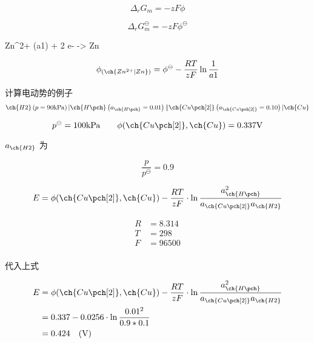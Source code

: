     \begin{equation*}
        \Delta_r G_m = -zF\phi
    \end{equation*}

    \begin{equation*}
        \Delta_r G_m ^\ominus = -zF\phi ^\ominus
    \end{equation*}

    \begin{reaction*}
        Zn^{2+} (a1) + 2 e- -> Zn
    \end{reaction*}

    \begin{equation*}
        \phi_{ \left( \ch{Zn^{2+} | Zn} \right) } = \phi^\ominus - \frac{RT}{zF} \ln \frac{1}{a1}
    \end{equation*}


    计算电动势的例子
    \begin{equation*}
        \ch{H2}\left( p = 90 \mathrm{kPa} \right) | \ch{H\pch} \left( a_{\ch{H\pch}} = 0.01 \right)  \| \ch{Cu\pch[2]} \left( a_{\ch{Cu\pch[2]}} = 0.10 \right)| \ch{Cu}
    \end{equation*}

    \begin{equation*}
        p^\ominus = 100 \mathrm{kPa} \qquad \phi(\ch{Cu\pch[2]}, \ch{Cu}) = 0.337 \mathrm{V}
    \end{equation*}

    $a_{\ch{H2}}$ 为 

    \begin{equation*}
        \frac{p}{p^\ominus} = 0.9
    \end{equation*}

    \begin{equation*}
        E = \phi(\ch{Cu\pch[2]}, \ch{Cu}) - \frac{RT}{zF} \cdot \ln \frac{a_{\ch{H\pch}}^2}{a_{\ch{Cu\pch[2]} }a_{\ch{H2}}}
    \end{equation*}

    \begin{align*}
        R &= 8.314 \\
        T &= 298 \\ 
        F &= 96500 \\ 
    \end{align*}

    代入上式

    \begin{align*}
        E &= \phi(\ch{Cu\pch[2]}, \ch{Cu}) - \frac{RT}{zF} \cdot \ln \frac{a_{\ch{H\pch}}^2}{a_{\ch{Cu\pch[2]} }a_{\ch{H2}}} \\ 
        &= 0.337 - 0.0256 \cdot \ln \frac{0.01^2}{0.9 * 0.1} \\ 
        &= 0.424 \quad (\mathrm{V} )
    \end{align*}
